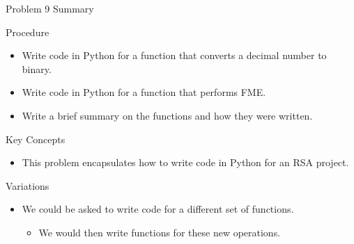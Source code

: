 \begin{summary}{Problem 9 Summary}
    \begin{statement}{Procedure}
        \begin{itemize}
            \item Write code in Python for a function that converts a decimal number to binary.
            \item Write code in Python for a function that performs FME.
            \item Write a brief summary on the functions and how they were written.
        \end{itemize}
    \end{statement}
    \begin{statement}{Key Concepts}
        \begin{itemize}
            \item This problem encapsulates how to write code in Python for an RSA project.
        \end{itemize}
    \end{statement}
    \begin{statement}{Variations}
        \begin{itemize}
            \item We could be asked to write code for a different set of functions.
            \begin{itemize}
                \item We would then write functions for these new operations.
            \end{itemize}
        \end{itemize}
    \end{statement}
\end{summary}

